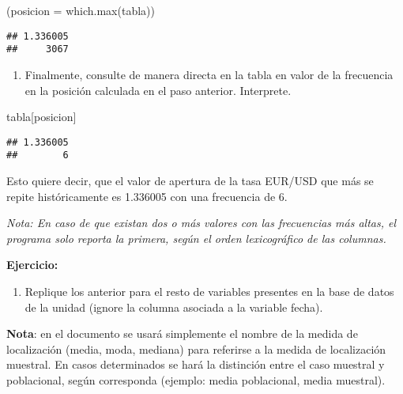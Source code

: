 \documentclass[
]{book}
\newenvironment{Shaded}{\begin{snugshade}}{\end{snugshade}}
\newcommand{\AttributeTok}[1]{\textcolor[rgb]{0.77,0.63,0.00}{#1}}
\newcommand{\FunctionTok}[1]{\textcolor[rgb]{0.00,0.00,0.00}{#1}}
\newcommand{\NormalTok}[1]{#1}
\providecommand{\tightlist}{%
  \setlength{\itemsep}{0pt}\setlength{\parskip}{0pt}}
\begin{document}
\begin{Shaded}
\begin{Highlighting}[]
\NormalTok{(}\AttributeTok{posicion =} \FunctionTok{which.max}\NormalTok{(tabla))}
\end{Highlighting}
\end{Shaded}

\begin{verbatim}
## 1.336005 
##     3067
\end{verbatim}

\begin{enumerate}
\def\labelenumi{\arabic{enumi}.}
\setcounter{enumi}{2}
\tightlist
\item
  Finalmente, consulte de manera directa en la tabla en valor de la frecuencia en la posición calculada en el paso anterior. Interprete.
\end{enumerate}

\begin{Shaded}
\begin{Highlighting}[]
\NormalTok{tabla[posicion]}
\end{Highlighting}
\end{Shaded}

\begin{verbatim}
## 1.336005 
##        6
\end{verbatim}

Esto quiere decir, que el valor de apertura de la tasa EUR/USD que más se repite históricamente es 1.336005 con una frecuencia de 6.

\emph{Nota: En caso de que existan dos o más valores con las frecuencias más altas, el programa solo reporta la primera, según el orden lexicográfico de las columnas.}

\textbf{Ejercicio:}

\begin{enumerate}
\def\labelenumi{\arabic{enumi}.}
\tightlist
\item
  Replique los anterior para el resto de variables presentes en la base de datos de la unidad (ignore la columna asociada a la variable fecha).
\end{enumerate}

\textbf{Nota}: en el documento se usará simplemente el nombre de la medida de localización (media, moda, mediana) para referirse a la medida de localización muestral. En casos determinados se hará la distinción entre el caso muestral y poblacional, según corresponda (ejemplo: media poblacional, media muestral).
\end{document}
